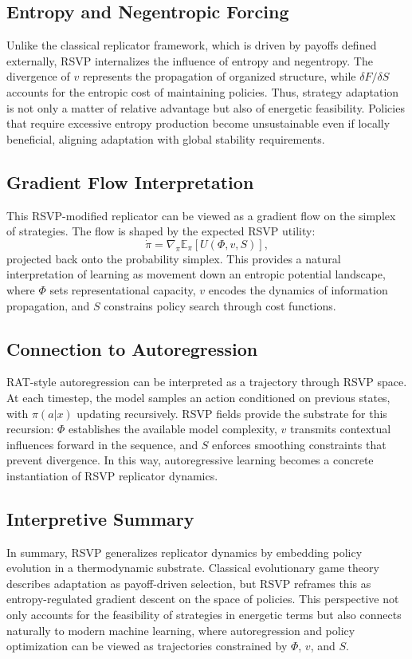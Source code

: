 \documentclass[12pt]{article}
\begin{document}
\subsection{Entropy and Negentropic Forcing}
Unlike the classical replicator framework, which is driven by payoffs defined externally, RSVP internalizes the influence of entropy and negentropy. The divergence of $v$ represents the propagation of organized structure, while $\delta F/\delta S$ accounts for the entropic cost of maintaining policies. Thus, strategy adaptation is not only a matter of relative advantage but also of energetic feasibility. Policies that require excessive entropy production become unsustainable even if locally beneficial, aligning adaptation with global stability requirements.

\subsection{Gradient Flow Interpretation}
This RSVP-modified replicator can be viewed as a gradient flow on the simplex of strategies. The flow is shaped by the expected RSVP utility:
\begin{equation}
\dot{\pi} = \nabla_\pi \mathbb{E}_{\pi}[U(\Phi,v,S)] ,
\end{equation}
projected back onto the probability simplex. This provides a natural interpretation of learning as movement down an entropic potential landscape, where $\Phi$ sets representational capacity, $v$ encodes the dynamics of information propagation, and $S$ constrains policy search through cost functions.

\subsection{Connection to Autoregression}
RAT-style autoregression \cite{Hinton2006,LeCun2015} can be interpreted as a trajectory through RSVP space. At each timestep, the model samples an action conditioned on previous states, with $\pi(a|x)$ updating recursively. RSVP fields provide the substrate for this recursion: $\Phi$ establishes the available model complexity, $v$ transmits contextual influences forward in the sequence, and $S$ enforces smoothing constraints that prevent divergence. In this way, autoregressive learning becomes a concrete instantiation of RSVP replicator dynamics.

\subsection{Interpretive Summary}
In summary, RSVP generalizes replicator dynamics by embedding policy evolution in a thermodynamic substrate. Classical evolutionary game theory describes adaptation as payoff-driven selection, but RSVP reframes this as entropy-regulated gradient descent on the space of policies. This perspective not only accounts for the feasibility of strategies in energetic terms but also connects naturally to modern machine learning, where autoregression and policy optimization can be viewed as trajectories constrained by $\Phi$, $v$, and $S$.
\end{document}
